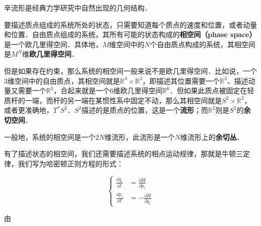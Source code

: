 
辛流形是经典力学研究中自然出现的几何结构．

要描述质点组成的系统所处的状态，只需要知道每个质点的速度和位置，或者动量和位置．自由质点组成的系统，其所有可能的状态构成的\textbf{相空间（phase space）}是一个欧几里得空间．具体地，$M$维空间中的$N$个自由质点构成的系统，其相空间是$M^N$维\textbf{欧几里得空间}．

但是如果存在约束，那么系统的相空间一般来说不是欧几里得空间．比如说，一个$3$维空间中的自由质点，其相空间就是$\mathbb{R}^3\times \mathbb{R}^3$，即描述其位置需要一个$\mathbb{R}^3$、描述动量又需要一个$\mathbb{R}^3$，合起来就是一个$6$维欧几里得空间$\mathbb{R}^6$．但如果此质点被固定在轻质杆的一端，而杆的另一端在某惯性系中固定不动，那么其相空间就是$S^2\times \mathbb{R}^2$，或者更准确地，$T^* S^2$．$S^2$描述的是质点的位置，这是一个\textbf{流形}；而$\mathbb{R}^2$则是$S^2$的\textbf{余切空间}．

一般地，系统的相空间是一个$2N$维流形，此流形是一个$N$维流形上的\textbf{余切丛}．

有了描述状态的相空间，我们还需要描述系统的相点运动规律，那就是牛顿三定律，我们写为哈密顿正则方程的形式：

\begin{equation}\label{SplcMn_eq1}
\left\{
\begin{aligned}
\frac{\dd q_i}{\dd t} &= \frac{\partial H}{\partial p_i}\\
\frac{\dd p_i}{\dd t} &= -\frac{\partial H}{\partial q_i}
\end{aligned}
\right. 
\end{equation}

由



























